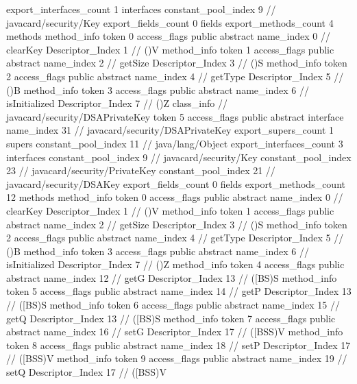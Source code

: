 {{{			export_interfaces_count	1
			interfaces {
				constant_pool_index	9		// javacard/security/Key
			}
			export_fields_count	0
			fields {
			}
			export_methods_count	4
			methods {
				method_info {
					token	0
					access_flags	public abstract
					name_index	0		// clearKey
					Descriptor_Index	1		// ()V
				}
				method_info {
					token	1
					access_flags	public abstract
					name_index	2		// getSize
					Descriptor_Index	3		// ()S
				}
				method_info {
					token	2
					access_flags	public abstract
					name_index	4		// getType
					Descriptor_Index	5		// ()B
				}
				method_info {
					token	3
					access_flags	public abstract
					name_index	6		// isInitialized
					Descriptor_Index	7		// ()Z
				}
			}
		}
		class_info {		// javacard/security/DSAPrivateKey
			token	5
			access_flags	public abstract interface
			name_index	31		// javacard/security/DSAPrivateKey
			export_supers_count	1
			supers {
				constant_pool_index	11		// java/lang/Object
			}
			export_interfaces_count	3
			interfaces {
				constant_pool_index	9		// javacard/security/Key
				constant_pool_index	23		// javacard/security/PrivateKey
				constant_pool_index	21		// javacard/security/DSAKey
			}
			export_fields_count	0
			fields {
			}
			export_methods_count	12
			methods {
				method_info {
					token	0
					access_flags	public abstract
					name_index	0		// clearKey
					Descriptor_Index	1		// ()V
				}
				method_info {
					token	1
					access_flags	public abstract
					name_index	2		// getSize
					Descriptor_Index	3		// ()S
				}
				method_info {
					token	2
					access_flags	public abstract
					name_index	4		// getType
					Descriptor_Index	5		// ()B
				}
				method_info {
					token	3
					access_flags	public abstract
					name_index	6		// isInitialized
					Descriptor_Index	7		// ()Z
				}
				method_info {
					token	4
					access_flags	public abstract
					name_index	12		// getG
					Descriptor_Index	13		// ([BS)S
				}
				method_info {
					token	5
					access_flags	public abstract
					name_index	14		// getP
					Descriptor_Index	13		// ([BS)S
				}
				method_info {
					token	6
					access_flags	public abstract
					name_index	15		// getQ
					Descriptor_Index	13		// ([BS)S
				}
				method_info {
					token	7
					access_flags	public abstract
					name_index	16		// setG
					Descriptor_Index	17		// ([BSS)V
				}
				method_info {
					token	8
					access_flags	public abstract
					name_index	18		// setP
					Descriptor_Index	17		// ([BSS)V
				}
				method_info {
					token	9
					access_flags	public abstract
					name_index	19		// setQ
					Descriptor_Index	17		// ([BSS)V
}}}}}
